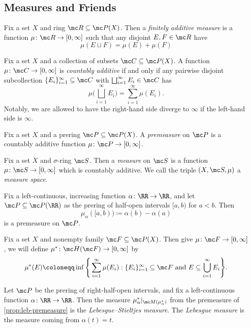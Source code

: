 \documentclass{article}
\begin{document}
\subsection{Measures and Friends}
\begin{definition}
	Fix a set $X$ and ring $\mc R\subseteq\mc P(X)$. Then a \textit{finitely additive measure} is a function $\mu\colon\mc R\to[0,\infty]$ such that any disjoint $E,F\in\mc R$ have
	\[\mu(E\sqcup F)=\mu(E)+\mu(F)\]
\end{definition}
\begin{definition}
	Fix a set $X$ and a collection of subsets $\mc C\subseteq\mc P(X)$. A function $\mu\colon\mc C\to[0,\infty]$ is \textit{countably additive} if and only if any pairwise disjoint subcollection $\{E_i\}_{i=1}^\infty\subseteq\mc C$ with $\bigsqcup_{i=1}^\infty E_i\in\mc C$ has
	\[\mu\Bigg(\bigsqcup_{i=1}^\infty E_i\Bigg)=\sum_{i=1}^\infty\mu(E_i).\]
	Notably, we are allowed to have the right-hand side diverge to $\infty$ if the left-hand side is $\infty$.
\end{definition}
\begin{definition}[Premeasure]
	Fix a set $X$ and a prering $\mc P\subseteq\mc P(X)$. A \textit{premeasure} on $\mc P$ is a countably additive function $\mu\colon\mc P\to[0,\infty]$.
\end{definition}
\begin{definition}[Measure]
	Fix a set $X$ and $\sigma$-ring $\mc S$. Then a \textit{measure} on $\mc S$ is a function $\mu\colon\mc S\to[0,\infty]$ which is countably additive. We call the triple $(X,\mc S,\mu)$ a \textit{measure space}.
\end{definition}
\begin{example} \label{prop:leb-premeasure}
	Fix a left-continuous, increasing function $\alpha\colon\RR\to\RR$, and let $\mc P\subseteq\mc P(\RR)$ as the prering of half-open intervals $[a,b)$ for $a<b$. Then
	\[\mu_\alpha([a,b))\coloneqq\alpha(b)-\alpha(a)\]
	is a premeasure on $\mc P$.
\end{example}
\begin{notation}
	Fix a set $X$ and nonempty family $\mc F\subseteq\mc P(X)$. Then give $\mu\colon\mc F\to[0,\infty]$, we will define $\mu^*\colon\mc H(\mc F)\to[0,\infty]$ by
	\[\mu^*(E)\coloneqq\inf\Bigg\{\sum_{i=1}^\infty\mu(E_i):\{E_i\}_{i=1}^\infty\subseteq\mc F\text{ and }E\subseteq\bigcup_{i=1}^\infty E_i\Bigg\}.\]
\end{notation}
\begin{definition}
	Let $\mc P$ be the prering of right-half-open intervals, and fix a left-continuous function $\alpha\colon\RR\to\RR$. Then the measure $\mu_\alpha^*|_{\mc M(\mu_\alpha^*)}$ from the premeasure of \autoref{prop:leb-premeasure} is the \textit{Lebesgue--Stieltjes measure}. The \textit{Lebesgue measure} is the measure coming from $\alpha(t)=t$.
\end{definition}
\end{document}
